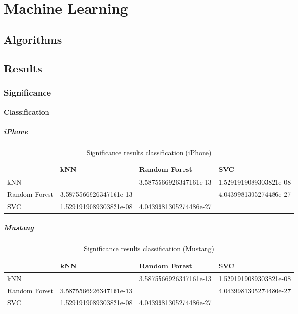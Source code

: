 \chapter{Machine Learning}
\section{Algorithms}
\section{Results}
\subsection{Significance}
\subsubsection{Classification}
\paragraph{iPhone}
\begin{table}[h]
	\begin{center}
	\begin{tabular}{| p{3.25cm} || p{3.25cm} | p{3.25cm} | p{3.25cm} |}
		\hline
		& kNN & Random Forest & SVC \\
		\hline \hline
		kNN & & 3.5875566926347161e-13 & 1.5291919089303821e-08 \\
		\hline
		Random Forest & 3.5875566926347161e-13 & & 4.0439981305274486e-27 \\
		\hline
		SVC & 1.5291919089303821e-08 & 4.0439981305274486e-27 & \\
		\hline
	\end{tabular}
	\end{center}
	\caption{Significance results classification (iPhone)}
	\label{tab_commission}
\end{table}
\paragraph{Mustang}
\begin{table}[h]
	\begin{center}
	\begin{tabular}{| p{3.25cm} || p{3.25cm} | p{3.25cm} | p{3.25cm} |}
		\hline
		& kNN & Random Forest & SVC \\
		\hline \hline
		kNN & & 3.5875566926347161e-13 & 1.5291919089303821e-08 \\
		\hline
		Random Forest & 3.5875566926347161e-13 & & 4.0439981305274486e-27 \\
		\hline
		SVC & 1.5291919089303821e-08 & 4.0439981305274486e-27 & \\
		\hline
	\end{tabular}
	\end{center}
	\caption{Significance results classification (Mustang)}
	\label{tab_commission}
\end{table}
